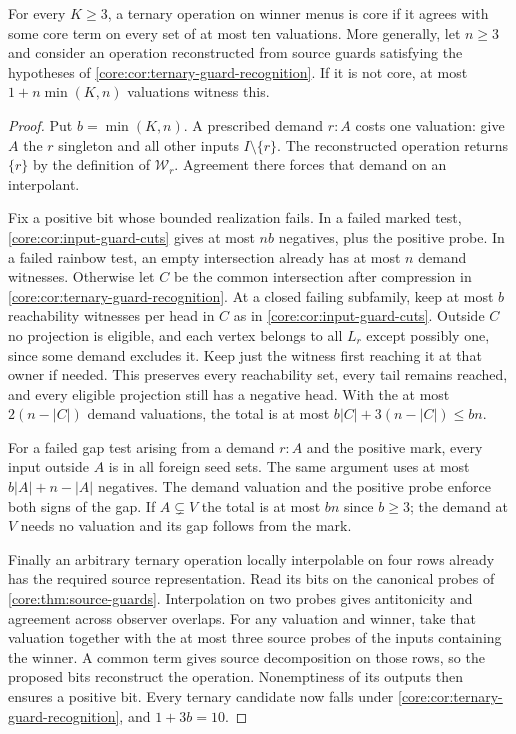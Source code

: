 \begin{corollary}
\label{core:cor:ternary-uniform-interpolation}
For every $K\ge3$, a ternary operation on winner menus is core if it
agrees with some core term on every set of at most ten valuations.
More generally, let $n\ge3$ and consider an operation reconstructed
from source guards satisfying the hypotheses of
\cref{core:cor:ternary-guard-recognition}. If it is not core, at most
$1+n\min(K,n)$ valuations witness this.
\end{corollary}
\begin{proof}
Put $b=\min(K,n)$. A prescribed demand $r:A$ costs one valuation:
give $A$ the $r$ singleton and all other inputs $I\setminus\{r\}$.
The reconstructed operation returns $\{r\}$ by the definition of
$\mathcal W_r$. Agreement there forces that demand on an interpolant.

Fix a positive bit whose bounded realization fails. In a failed
marked test, \cref{core:cor:input-guard-cuts} gives at most $nb$
negatives, plus the positive probe. In a failed rainbow test, an
empty intersection already has at most $n$ demand witnesses.
Otherwise let $C$ be the common intersection after compression in
\cref{core:cor:ternary-guard-recognition}. At a closed failing
subfamily, keep at most $b$ reachability witnesses per head in $C$
as in \cref{core:cor:input-guard-cuts}. Outside $C$ no projection
is eligible, and each vertex belongs to all $L_r$ except possibly
one, since some demand excludes it. Keep just the witness first
reaching it at that owner if needed. This preserves every reachability
set, every tail remains reached, and every eligible projection still
has a negative head. With the at most $2(n-|C|)$ demand valuations,
the total is at most $b|C|+3(n-|C|)\le bn$.

For a failed gap test arising from a demand $r:A$ and the positive
mark, every input outside $A$ is in all foreign seed sets.
The same argument uses at most $b|A|+n-|A|$ negatives. The demand
valuation and the positive probe enforce both signs of the gap.
If $A\subsetneq V$ the total is at most $bn$ since $b\ge3$;
the demand at $V$ needs no valuation and its gap follows from the mark.

Finally an arbitrary ternary operation locally interpolable on four
rows already has the required source representation. Read its bits
on the canonical probes of \cref{core:thm:source-guards}. Interpolation
on two probes gives antitonicity and agreement across observer overlaps.
For any valuation and winner, take that valuation together with the
at most three source probes of the inputs containing the winner. A
common term gives source decomposition on those rows, so the proposed
bits reconstruct the operation. Nonemptiness of its outputs then
ensures a positive bit. Every ternary candidate now falls under
\cref{core:cor:ternary-guard-recognition}, and $1+3b=10$.
\end{proof}

